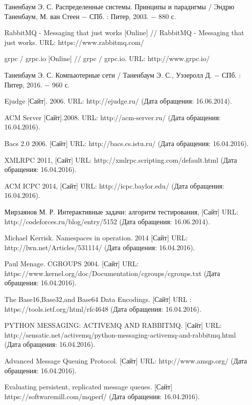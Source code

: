 \begin{thebibliography}{9}

Таненбаум Э. С. Распределенные системы. Принципы и парадигмы / Эндрю Таненбаум, М. ван Стеен − СПб. : Питер, 2003. − 880 с.

RabbitMQ - Messaging that just works [Online] // RabbitMQ - Messaging that just works. URL: https://www.rabbitmq.com/

grpc / grpc.io [Online] // grpc / grpc.io. URL: http://www.grpc.io/

Таненбаум Э. С. Компьютерные сети / Таненбаум Э. С., Уэзеролл Д. − СПб. : Питер, 2016. − 960 с.

Ejudge [Сайт]. 2006. URL: http://ejudge.ru/ (Дата обращения: 16.06.2014).

ACM Server [Сайт].2008. URL: http://acm-server.ru/ (Дата обращения: 16.04.2016).

Bacs 2.0 2006. [Сайт] URL: http://bacs.cs.istu.ru/ (Дата обращения: 16.04.2016).

XMLRPC 2011, [Сайт] URL: http://xmlrpc.scripting.com/default.html (Дата обращения: 16.04.2016).

ACM ICPC 2014, [Сайт] URL: http://icpc.baylor.edu/ (Дата обращения: 16.04.2016).

Мирзаянов М. Р. Интерактивные задачи: алгоритм тестирования, [Сайт] URL: http://codeforces.ru/blog/entry/5152 (Дата обращения: 16.06.2014).

Michael Kerrisk. Namespaces in operation. 2014 [Сайт] URL: http://lwn.net/Articles/531114/ (Дата обращения: 16.04.2016).

Paul Menage. CGROUPS 2004. [Сайт] URL: https://www.kernel.org/doc/Documentation/cgroups/cgroups.txt (Дата обращения: 16.04.2016).

The Base16,Base32,and Base64 Data Encodings. [Сайт] URL : https://tools.ietf.org/html/rfc4648 (Дата обращения: 16.04.2016).

PYTHON MESSAGING: ACTIVEMQ AND RABBITMQ. [Сайт] URL: http://sensatic.net/activemq/python-messaging-activemq-and-rabbitmq.html (Дата обращения: 16.04.2016).

Advanced Message Queuing Protocol. [Сайт] URL: http://www.amqp.org/ (Дата обращения: 16.04.2016).

Evaluating persistent, replicated message queues. [Сайт] https://softwaremill.com/mqperf/ (Дата обращения: 16.04.2016).


\end{thebibliography}
